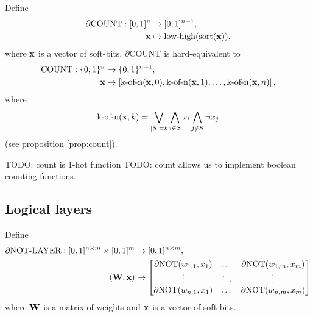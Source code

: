 \documentclass{article} %
\begin{document}
Define
\begin{equation*}
\begin{aligned}
\partial\text{COUNT}: [0,1]^{n} &\to [0,1]^{n+1}, \\
{\bf x} &\mapsto \operatorname{low-high}(\operatorname{sort}({\bf x}))\text{,}
\end{aligned}
\end{equation*}
where ${\bf x}$ is a vector of soft-bits. $\partial${COUNT} is hard-equivalent to
\begin{equation*}
\begin{aligned}
\text{COUNT}: \{0,1\}^{n} &\to \{0,1\}^{n+1}, \\
{\bf x} &\mapsto \left[\operatorname{k-of-n}({\bf x}, 0), \operatorname{k-of-n}({\bf x}, 1), \dots, \operatorname{k-of-n}({\bf x}, n)\right]\text{,}
\end{aligned}
\end{equation*}
where
\begin{equation*}
\operatorname{k-of-n}({\bf x}, k) = \bigvee_{|S|=k} \bigwedge_{i\in S} x_i \bigwedge_{j\notin S} \neg x_j
\end{equation*}
(see proposition \ref{prop:count}).


TODO: count is 1-hot function
TODO: count allows us to implement boolean counting functions.

\subsection{Logical layers}

Define
\begin{equation*}
\begin{aligned}
\partial\text{NOT-LAYER}: [0,1]^{n \times m} \times [0,1]^{m} &\to [0,1]^{n \times m}, \\
({\bf W}, {\bf x}) &\mapsto 
\begin{bmatrix}
\partial\text{NOT}(w_{1,1}, x_{1}) & \dots & \partial\text{NOT}(w_{1,m}, x_{m}) \\
\vdots & \ddots & \vdots \\
\partial\text{NOT}(w_{n,1}, x_{1}) & \dots & \partial\text{NOT}(w_{n,m}, x_{m})
\end{bmatrix}
\end{aligned}
\end{equation*}
where ${\bf W}$ is a matrix of weights and ${\bf x}$ is a vector of soft-bits.
\end{document}

